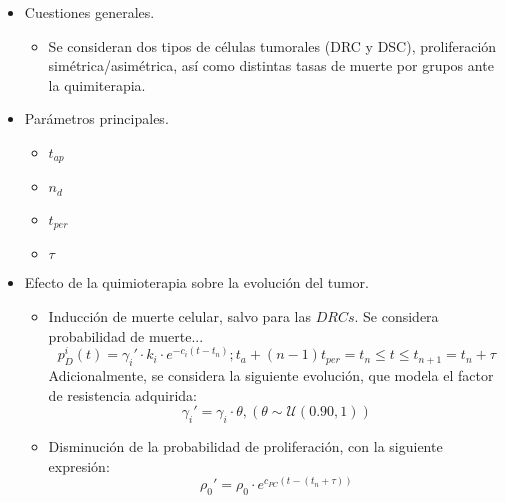 \begin{itemize}
    
    \item Cuestiones generales.\\
    \begin{itemize}
        \item Se consideran dos tipos de células tumorales (DRC y DSC), proliferación simétrica/asimétrica, así como distintas tasas de muerte por grupos ante la quimiterapia.
    \end{itemize}

    \item Parámetros principales.\\ 
    \begin{itemize}
        \item $t_{ap}$
        \item $n_d$
        \item $t_{per}$
        \item $\tau$
    \end{itemize}
    
    \item Efecto de la quimioterapia sobre la evolución del tumor.\\ 
    \begin{itemize}
        \item Inducción de muerte celular, salvo para las $DRCs$. Se considera  probabilidad de muerte... 
        $$p^i_D(t) = \gamma_i'·k_i·e^{-c_i(t-t_n)}; t_a + (n-1) t_{per} = t_n \leq t \leq t_{n+1} = t_n + \tau$$
        Adicionalmente, se considera la siguiente evolución, que modela el factor de resistencia adquirida:
        $$\gamma_i' = \gamma_i·\theta, (\theta \sim \mathcal{U}(0.90, 1))$$
        \item Disminución de la probabilidad de proliferación, con la siguiente expresión:
        $$\rho_0' = \rho_0·e^{c_{PC}(t-(t_n+\tau))}$$
    \end{itemize}
    
\end{itemize}
